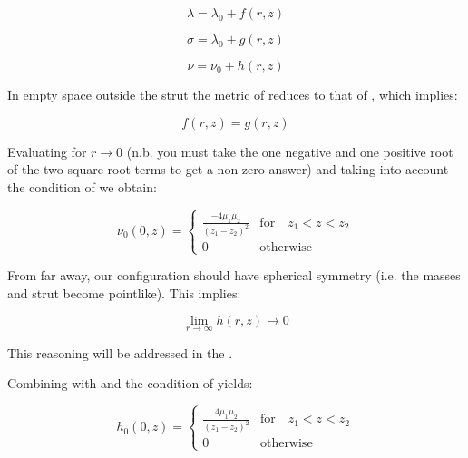 \documentclass{article}
\begin{document}
\begin{equation}
	\label{eq:lambda-matter}
	\lambda=\lambda_0 + f(r,z)
\end{equation}

\begin{equation}
	\label{eq:sigma-matter}
	\sigma=\lambda_0 + g(r,z)
\end{equation}

\begin{equation}
	\label{eq:nu-matter}
	\nu=\nu_0 + h(r,z)
\end{equation}

In empty space outside the strut the metric of  reduces to that of  , which implies:

\begin{equation}
	\label{eq:f=g}
	f(r,z)=g(r,z)
\end{equation}

Evaluating  for $r\rightarrow 0$ (n.b. you must take the one negative and one positive root of the two square root terms to get a non-zero answer) and taking into account the condition of  we obtain:

\begin{equation}
\label{eq:nu_r=0}
\nu_0 (0,z) = \left\{  \begin{array}{cl}\frac{-4\mu_{1}\mu_{2}}{\left(z_{1}-z_{2}\right)^{2}} & \mbox{for}\quad  z_{1}<z<z_{2} \\ 0 & \mbox{otherwise}\end{array}\right. 
\end{equation}

From far away, our configuration should have spherical symmetry (i.e. the masses and strut become pointlike). This implies:

\begin{equation}
	\label{eq:h-limit}
	\lim_{r\rightarrow \infty} h(r,z)\rightarrow 0
\end{equation}

This reasoning will be addressed in the .

Combining  with  and the condition of  yields:

\begin{equation}
\label{eq:h_r=0}
h_0 (0,z) = \left\{  \begin{array}{cl}\frac{4\mu_{1}\mu_{2}}{\left(z_{1}-z_{2}\right)^{2}} & \mbox{for}\quad  z_{1}<z<z_{2} \\ 0 & \mbox{otherwise}\end{array}\right. 
\end{equation}
\end{document}
